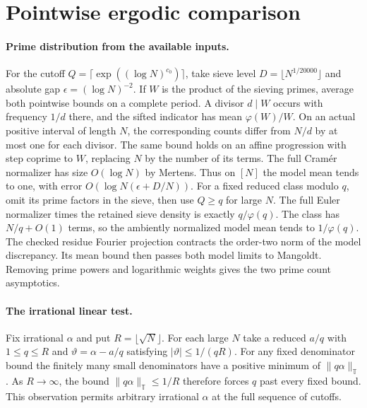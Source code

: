 \section{Pointwise ergodic comparison}

\paragraph{Prime distribution from the available inputs.}
For the cutoff $Q=\lceil\exp((\log N)^{c_0})\rceil$, take sieve
level $D=\lfloor N^{1/20000}\rfloor$ and absolute gap
$\epsilon=(\log N)^{-2}$. If $W$ is the product of the sieving
primes, average both pointwise bounds on a complete period. A divisor
$d\mid W$ occurs with frequency $1/d$ there, and the sifted indicator
has mean $\varphi(W)/W$. On an actual positive interval of length $N$,
the corresponding counts differ from $N/d$ by at most one for each
divisor. The same bound holds on an affine progression with step
coprime to $W$, replacing $N$ by the number of its terms. The full
Cram\'er normalizer has size $O(\log N)$ by Mertens. Thus on $[N]$ the
model mean tends to one, with error $O(\log N(\epsilon+D/N))$.
For a fixed reduced class modulo $q$, omit its prime factors in the
sieve, then use $Q\ge q$ for large $N$. The full Euler normalizer times
the retained sieve density is exactly $q/\varphi(q)$. The class has
$N/q+O(1)$ terms, so the ambiently normalized model mean tends to
$1/\varphi(q)$. The checked residue Fourier projection contracts the
order-two norm of the model discrepancy. Its mean bound then passes
both model limits to Mangoldt. Removing prime powers and logarithmic
weights gives the two prime count asymptotics.

\paragraph{The irrational linear test.}
Fix irrational $\alpha$ and put $R=\lfloor\sqrt N\rfloor$. For each
large $N$ take a reduced $a/q$ with $1\le q\le R$ and
$\vartheta=\alpha-a/q$ satisfying $|\vartheta|\le1/(qR)$.
For any fixed denominator bound the finitely many small denominators
have a positive minimum of $\|q\alpha\|_{\mathbb T}$. As
$R\to\infty$, the bound $\|q\alpha\|_{\mathbb T}\le1/R$ therefore
forces $q$ past every fixed bound. This observation permits arbitrary
irrational $\alpha$ at the full sequence of cutoffs.

